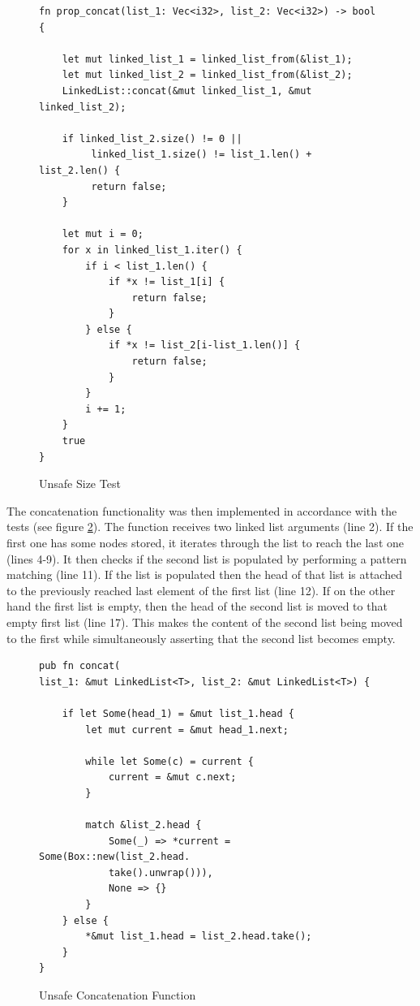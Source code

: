 \begin{figure}[H]
 \vspace{12pt}
\begin{lstlisting}[style=RUSTSTYLE]
fn prop_concat(list_1: Vec<i32>, list_2: Vec<i32>) -> bool {
    
    let mut linked_list_1 = linked_list_from(&list_1);
    let mut linked_list_2 = linked_list_from(&list_2);
    LinkedList::concat(&mut linked_list_1, &mut linked_list_2);
        
    if linked_list_2.size() != 0 || 
         linked_list_1.size() != list_1.len() + list_2.len() {
         return false;
    }
        
    let mut i = 0;
    for x in linked_list_1.iter() {
        if i < list_1.len() {
            if *x != list_1[i] {
                return false;
            }
        } else {
            if *x != list_2[i-list_1.len()] {
                return false;
            }
        }
        i += 1;
    }
    true
}
\end{lstlisting}
    \caption{Unsafe Size Test}
    \label{fig:unsafetest}
\end{figure}

The concatenation functionality was then implemented in accordance with the tests (see figure \ref{fig:unsafeconcat}). The function receives two linked list arguments (line 2). If the first one has some nodes stored, it iterates through the list to reach the last one (lines 4-9). It then checks if the second list is populated by performing a pattern matching (line 11). If the list is populated then the head of that list is attached to the previously reached last element of the first list (line 12). If on the other hand the first list is empty, then the head of the second list is moved to that empty first list (line 17). This makes the content of the second list being moved to the first while simultaneously asserting that the second list becomes empty.


\begin{figure}[H]
 \vspace{12pt}
\begin{lstlisting}[style=RUSTSTYLE]
pub fn concat(
list_1: &mut LinkedList<T>, list_2: &mut LinkedList<T>) {

    if let Some(head_1) = &mut list_1.head {
        let mut current = &mut head_1.next; 
    
        while let Some(c) = current {
            current = &mut c.next; 
        }
    
        match &list_2.head {
            Some(_) => *current = Some(Box::new(list_2.head.
            take().unwrap())),
            None => {}
        }
    } else {
        *&mut list_1.head = list_2.head.take();
    }
}
\end{lstlisting} 
    \caption{Unsafe Concatenation Function}
    \label{fig:unsafeconcat}
\end{figure}

